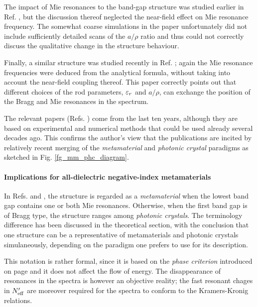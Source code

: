 The impact of Mie resonances to the band-gap structure was studied earlier in Ref. \cite{shi2007}, but the discussion thereof neglected the near-field effect on Mie resonance frequency. The somewhat coarse simulations in the paper unfortunately did not include sufficiently detailed scans of the $a/\rho$ ratio and thus could not correctly discuss the qualitative change in the structure behaviour. 

Finally, a similar structure was studied recently in Ref. \cite{rybin2014photonic}; again the Mie resonance frequencies were deduced from the analytical formula, without taking into account the near-field coupling thereof. This paper correctly points out that different choices of the rod parameters, $\varepsilon_r$ and $a/\rho$, can exchange the position of the Bragg and Mie resonances in the spectrum.

The relevant papers (Refs. \cite{shi2007, peng2007, vynck2009all, rybin2014photonic, dominec2014transition}) come from the last ten years, although they are based on experimental and numerical methods that could be used already several decades ago. This confirms the author's view that the publications are incited by relatively recent merging of the \textit{metamaterial} and \textit{photonic crystal} paradigms as sketched in Fig. \ref{fg_mm_phc_diagram}.

\paragraph{Implications for all-dielectric negative-index metamaterials} %
In Refs.  \cite{rybin2014photonic} and \cite{dominec2014transition}, the structure is regarded as a \textit{metamaterial} when the lowest band gap contains one or both Mie resonances. Otherwise, when the first band gap is of Bragg type, the structure ranges among \textit{photonic crystals}. 
The terminology difference has been discussed in the theoretical section, with the conclusion that one structure can be a representative of metamaterials and photonic crystals simulaneously, depending on the paradigm one prefers to use for its description. 

This notation is rather formal, since it is based on the \textit{phase criterion} introduced on page \pageref{phasecriterion} and it does not affect the flow of energy. 
The disappearance of resonances in the spectra is however an objective reality; the fast resonant chages in $N_{\text{eff} }'$ are moreover required for the spectra to conform to the Kramers-Kronig relations. 

